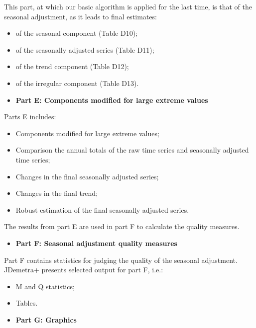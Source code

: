 \documentclass[
  letterpaper,
  DIV=11,
  numbers=noendperiod]{scrreprt}
\providecommand{\tightlist}{%
  \setlength{\itemsep}{0pt}\setlength{\parskip}{0pt}}\usepackage{longtable,booktabs,array}
\begin{document}
This part, at which our basic algorithm is applied for the last time, is
that of the seasonal adjustment, as it leads to final estimates:

\begin{itemize}
\item
  of the seasonal component (Table D10);
\item
  of the seasonally adjusted series (Table D11);
\item
  of the trend component (Table D12);
\item
  of the irregular component (Table D13).
\end{itemize}

\begin{itemize}
\tightlist
\item
  \textbf{Part E: Components modified for large extreme values}
\end{itemize}

Parts E includes:

\begin{itemize}
\item
  Components modified for large extreme values;
\item
  Comparison the annual totals of the raw time series and seasonally
  adjusted time series;
\item
  Changes in the final seasonally adjusted series;
\item
  Changes in the final trend;
\item
  Robust estimation of the final seasonally adjusted series.
\end{itemize}

The results from part E are used in part F to calculate the quality
measures.

\begin{itemize}
\tightlist
\item
  \textbf{Part F: Seasonal adjustment quality measures}
\end{itemize}

Part F contains statistics for judging the quality of the seasonal
adjustment. JDemetra+ presents selected output for part F, i.e.:

\begin{itemize}
\item
  M and Q statistics;
\item
  Tables.
\end{itemize}

\begin{itemize}
\tightlist
\item
  \textbf{Part G: Graphics}
\end{itemize}
\end{document}
